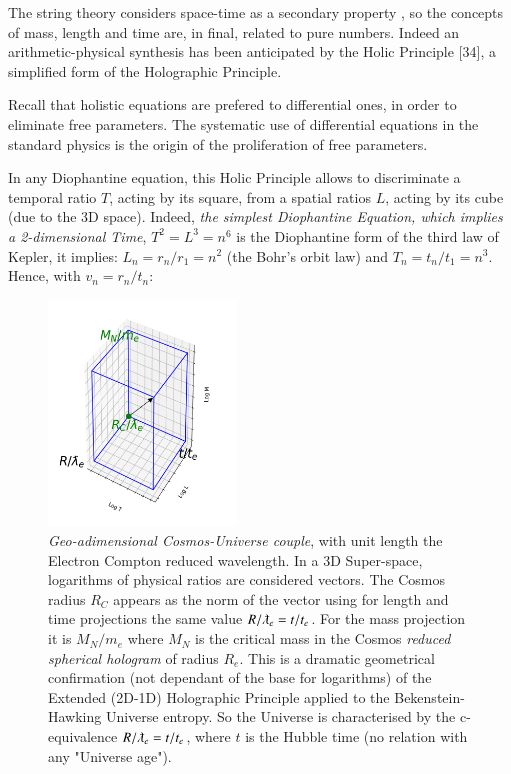 \documentclass[a4paper,9pt]{article}
\begin{document}
The string theory considers space-time as a secondary property \cite{Seiberg}, so the concepts of mass, length and time are, in final, related to pure numbers. Indeed an arithmetic-physical synthesis has been anticipated by the Holic Principle [34], a simplified form of the Holographic Principle. 

Recall that holistic equations are prefered to differential ones, in order to eliminate free parameters. 
The systematic use of differential equations in the standard physics is the origin of the proliferation of free parameters. 

\pagebreak

In any Diophantine equation, this Holic Principle allows to discriminate a temporal ratio $T$, acting by its square, from a spatial ratios $L$, acting by its cube (due to the 3D space). Indeed, \textit {the simplest Diophantine Equation, which implies a 2-dimensional Time}, $T^2 = L^3 = n^6$ is the Diophantine form of the third law of Kepler, it implies: $L_n = r_n /r_1 = n^2$ (the Bohr's orbit law) and $T_n = t_n/t_1 = n^3$. Hence, with $v_n = r_n/t_ n$:



\begin{figure}
\centering
\includegraphics[width=5cm,height=6cm]{./figure/triaxis.png}
\caption[Figure \ref{cuboid} MLT Adimensional cuboid]{\textit{Geo-adimensional Cosmos-Universe couple}, with unit length the Electron Compton reduced wavelength. In a 3D Super-space, logarithms of physical ratios are considered vectors. The Cosmos radius $ R_C$ appears as the norm of the vector using for length and time projections the same value $R/\lambdabar_e = t/t_e$. For the mass projection it is $M_N/m_e$ where $M_N$ is the critical mass in the Cosmos \textit{reduced spherical hologram} of radius $R_e$. This is a dramatic geometrical confirmation (not dependant of the base for logarithms) of the Extended (2D-1D) Holographic Principle applied to the Bekenstein-Hawking Universe entropy. So the Universe is characterised by the c-equivalence $R/\lambdabar_e = t/t_e$, where $t$ is the Hubble time (no relation with any "Universe age").} 
\label{cuboid}
\end{figure} 
\end{document}
